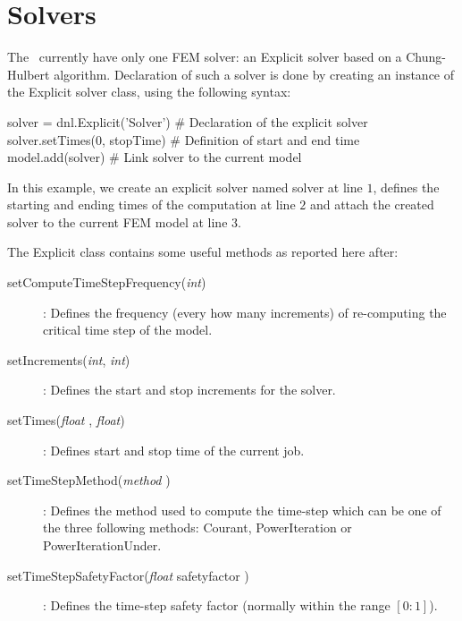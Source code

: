\section{Solvers}
The \DynELA~currently have only one FEM solver: an Explicit solver based on a Chung-Hulbert algorithm. Declaration of such a solver is done by creating an instance of the \textsf{Explicit} solver class, using the following syntax:
\begin{PythonListing}
solver = dnl.Explicit('Solver') # Declaration of the explicit solver
solver.setTimes(0, stopTime)    # Definition of start and end time
model.add(solver)               # Link solver to the current model
\end{PythonListing}
In this example, we create an explicit solver named solver at line $1$, defines the starting and ending times of the computation at line $2$ and attach the created solver to the current FEM model at line $3$.

The Explicit class contains some useful methods as reported here after:
\begin{description}
\item [{setComputeTimeStepFrequency(\emph{int})}] : Defines the frequency (\ie every how many increments) of re-computing the critical time step of the model.
\item [{setIncrements(\emph{int}, \emph{int})}] : Defines the start and stop increments for the solver.
\item [{setTimes(\emph{float} , \emph{float})}] : Defines start and stop time of the current job.
\item [{setTimeStepMethod(\emph{method} )}] : Defines the method used to compute the time-step which can be one of the three following methods: \textsf{Courant}, \textsf{PowerIteration} or \textsf{PowerIterationUnder}.
\item [{setTimeStepSafetyFactor(\emph{float} safetyfactor )}] : Defines the time-step safety factor (normally within the range  $[0:1]$).
\end{description}

